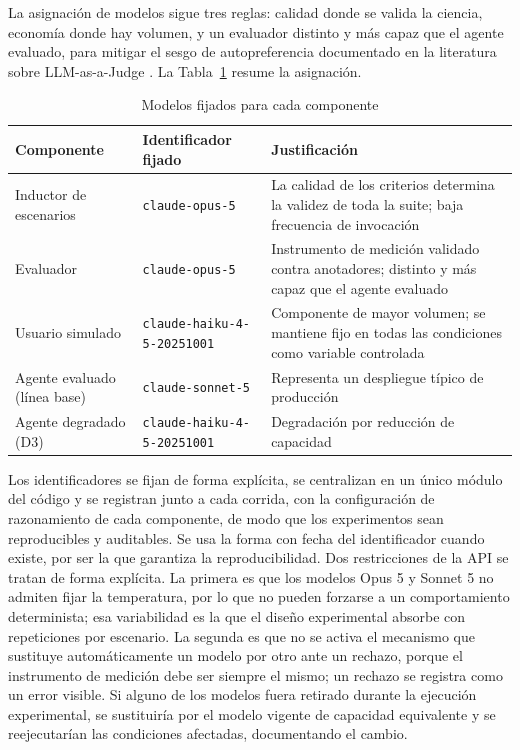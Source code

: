 La asignación de modelos sigue tres reglas: calidad donde se valida la ciencia, economía donde hay volumen, y un evaluador distinto y más capaz que el agente evaluado, para mitigar el sesgo de autopreferencia documentado en la literatura sobre LLM-as-a-Judge \cite{yehudai2025survey}. La Tabla~\ref{tab:modelos} resume la asignación.
\par

\begin{table}[H]
  \caption{Modelos fijados para cada componente}
  \label{tab:modelos}
  \begin{tabular}{|>{\raggedright\arraybackslash}p{1.3in}|>{\raggedright\arraybackslash}p{2.1in}|>{\raggedright\arraybackslash}p{2.35in}|}
    \hline
    \textbf{Componente} & \textbf{Identificador fijado} & \textbf{Justificación} \\ \hline
    Inductor de escenarios & {\small\texttt{claude-opus-5}} & La calidad de los criterios determina la validez de toda la suite; baja frecuencia de invocación \\ \hline
    Evaluador & {\small\texttt{claude-opus-5}} & Instrumento de medición validado contra anotadores; distinto y más capaz que el agente evaluado \\ \hline
    Usuario simulado & {\small\texttt{claude-haiku-4-5-20251001}} & Componente de mayor volumen; se mantiene fijo en todas las condiciones como variable controlada \\ \hline
    Agente evaluado (línea base) & {\small\texttt{claude-sonnet-5}} & Representa un despliegue típico de producción \\ \hline
    Agente degradado (D3) & {\small\texttt{claude-haiku-4-5-20251001}} & Degradación por reducción de capacidad \\ \hline
  \end{tabular}
\end{table}

Los identificadores se fijan de forma explícita, se centralizan en un único módulo del código y se registran junto a cada corrida, con la configuración de razonamiento de cada componente, de modo que los experimentos sean reproducibles y auditables. Se usa la forma con fecha del identificador cuando existe, por ser la que garantiza la reproducibilidad. Dos restricciones de la API se tratan de forma explícita. La primera es que los modelos Opus 5 y Sonnet 5 no admiten fijar la temperatura, por lo que no pueden forzarse a un comportamiento determinista; esa variabilidad es la que el diseño experimental absorbe con repeticiones por escenario. La segunda es que no se activa el mecanismo que sustituye automáticamente un modelo por otro ante un rechazo, porque el instrumento de medición debe ser siempre el mismo; un rechazo se registra como un error visible. Si alguno de los modelos fuera retirado durante la ejecución experimental, se sustituiría por el modelo vigente de capacidad equivalente y se reejecutarían las condiciones afectadas, documentando el cambio.
\par
\endgroup
